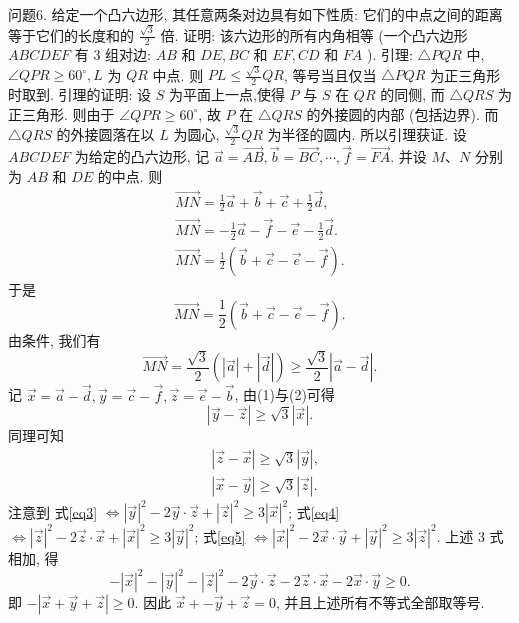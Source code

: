 问题6. 给定一个凸六边形, 其任意两条对边具有如下性质: 它们的中点之间的距离等于它们的长度和的 $\frac{\sqrt{3}}{2}$ 倍.
证明: 该六边形的所有内角相等 (一个凸六边形 $A B C D E F$ 有 3 组对边: $A B$ 和 $D E, B C$ 和 $E F, C D$ 和 $F A$ ).
引理: $\triangle P Q R$ 中, $\angle Q P R \geqslant 60^{\circ}, L$ 为 $Q R$ 中点.
则 $P L \leqslant \frac{\sqrt{3}}{2} Q R$, 等号当且仅当 $\triangle P Q R$ 为正三角形时取到.
引理的证明: 设 $S$ 为平面上一点,使得 $P$ 与 $S$ 在 $Q R$ 的同侧, 而 $\triangle Q R S$ 为正三角形.
则由于 $\angle Q P R \geqslant 60^{\circ}$, 故 $P$ 在 $\triangle Q R S$ 的外接圆的内部 (包括边界). 而 $\triangle Q R S$ 的外接圆落在以 $L$ 为圆心, $\frac{\sqrt{3}}{2} Q R$ 为半径的圆内.
所以引理获证.
设 $A B C D E F$ 为给定的凸六边形, 记 $\vec{a}=\overrightarrow{A B}, \vec{b}=\overrightarrow{B C}, \cdots, \vec{f}=\overrightarrow{F A}$. 并设 $M 、 N$ 分别为 $A B$ 和 $D E$ 的中点.
则
$$
\begin{gathered}
\overrightarrow{M N}=\frac{1}{2} \vec{a}+\vec{b}+\vec{c}+\frac{1}{2} \vec{d}, \\
\overrightarrow{M N}=-\frac{1}{2} \vec{a}-\vec{f}-\vec{e}-\frac{1}{2} \vec{d} . \\
\overrightarrow{M N}=\frac{1}{2}(\vec{b}+\vec{c}-\vec{e}-\vec{f}) .
\end{gathered}
$$
于是
$$
\overrightarrow{M N}=\frac{1}{2}(\vec{b}+\vec{c}-\vec{e}-\vec{f}) . \label{eq1}
$$
由条件, 我们有
$$
\overrightarrow{M N}=\frac{\sqrt{3}}{2}(|\vec{a}|+|\vec{d}|) \geqslant \frac{\sqrt{3}}{2}|\vec{a}-\vec{d}| . \label{eq2}
$$
记 $\vec{x}=\vec{a}-\vec{d}, \vec{y}=\vec{c}-\vec{f}, \vec{z}=\vec{e}-\vec{b}$, 由(1)与(2)可得
$$
|\vec{y}-\vec{z}| \geqslant \sqrt{3}|\vec{x}| . \label{eq3}
$$
同理可知
$$
\begin{aligned}
& |\vec{z}-\vec{x}| \geqslant \sqrt{3}|\vec{y}|, \label{eq4}\\
& |\vec{x}-\vec{y}| \geqslant \sqrt{3}|\vec{z}| . \label{eq5}
\end{aligned}
$$
注意到
式\ref{eq3} $\Leftrightarrow|\vec{y}|^2-2 \vec{y} \cdot \vec{z}+|\vec{z}|^2 \geqslant 3|\vec{x}|^2$;
式\ref{eq4} $\Leftrightarrow|\vec{z}|^2-2 \vec{z} \cdot \vec{x}+|\vec{x}|^2 \geqslant 3|\vec{y}|^2$;
式\ref{eq5} $\Leftrightarrow|\vec{x}|^2-2 \vec{x} \cdot \vec{y}+|\vec{y}|^2 \geqslant 3|\vec{z}|^2$.
上述 3 式相加, 得
$$
-|\vec{x}|^2-|\vec{y}|^2-|\vec{z}|^2-2 \vec{y} \cdot \vec{z}-2 \vec{z} \cdot \vec{x}-2 \vec{x} \cdot \vec{y} \geqslant 0 .
$$
即 $-|\vec{x}+\vec{y}+\vec{z}| \geqslant 0$. 因此 $\vec{x}+-\vec{y}+\vec{z}=0$, 并且上述所有不等式全部取等号.

